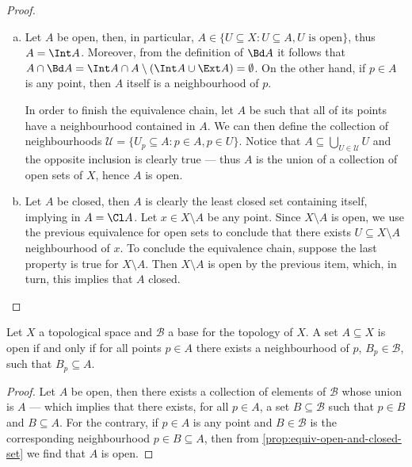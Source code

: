 \begin{proof}
\begin{enumerate}[(a)]\setlength\itemsep{0em}
\item Let \(A\) be open, then, in particular,
  \(A \in \{U \subseteq X \colon U \subseteq A, U \text{ is open}\}\), thus
  \(A = \Int A\). Moreover, from the definition of \(\Bd A\) it follows that
  \(A \cap \Bd A = \Int A \cap A \setminus (\Int A \cup \Ext A) =
  \emptyset\). On the other hand, if \(p \in A\) is any point, then \(A\) itself
  is a neighbourhood of \(p\).

  In order to finish the equivalence chain, let \(A\) be such that all of its
  points have a neighbourhood contained in \(A\). We can then define the
  collection of neighbourhoods
  \(\mathcal U = \{U_p \subseteq A \colon p \in A, p \in U\}\). Notice that
  \(A \subseteq \bigcup_{U \in \mathcal U} U\) and the opposite inclusion is
  clearly true --- thus \(A\) is the union of a collection of open sets of
  \(X\), hence \(A\) is open.

\item Let \(A\) be closed, then \(A\) is clearly the least closed set containing
  itself, implying in \(A = \Cl A\). Let \(x \in X \setminus A\) be any
  point. Since \(X \setminus A\) is open, we use the previous equivalence for
  open sets to conclude that there exists \(U \subseteq X \setminus A\)
  neighbourhood of \(x\).  To conclude the equivalence chain, suppose the last
  property is true for \(X \setminus A\). Then \(X \setminus A\) is open by the
  previous item, which, in turn, this implies that \(A\) closed.
\end{enumerate}
\end{proof}

\begin{proposition}
Let \(X\) a topological space and \(\mathcal B\) a base for the topology of
\(X\). A set \(A \subseteq X\) is open if and only if for all points \(p \in
A\) there exists a neighbourhood of \(p\), \(B_p \in \mathcal B\), such that
\(B_p \subseteq A\).
\end{proposition}

\begin{proof}
Let \(A\) be open, then there exists a collection of elements of \(\mathcal B\)
whose union is \(A\) --- which implies that there exists, for all \(p \in A\), a
set \(B \subseteq \mathcal B\) such that \(p \in B\) and \(B \subseteq
A\). For the contrary, if \(p \in A\) is any point and \(B \in \mathcal B\) is
the corresponding neighbourhood \(p \in B \subseteq A\), then from
\cref{prop:equiv-open-and-closed-set} we find that \(A\) is open.
\end{proof}

